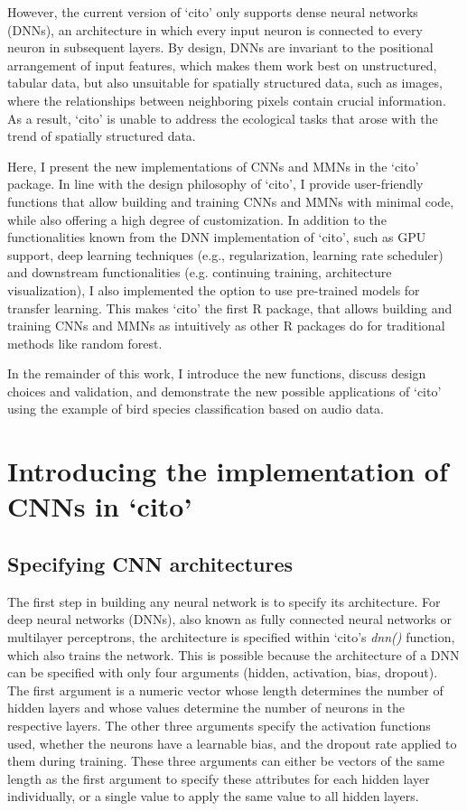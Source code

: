 \documentclass[12pt,twoside]{scrreport}
\newcommand{\pkg}[1]{`#1'}
\newcommand{\fn}[2][]{\textit{#2(}#1\textit{)}}
\begin{document}
However, the current version of \pkg{cito} only supports dense neural networks (DNNs), an architecture in which every input neuron is connected to every neuron in subsequent layers. By design, DNNs are invariant to the positional arrangement of input features, which makes them work best on unstructured, tabular data, but also unsuitable for spatially structured data, such as images, where the relationships between neighboring pixels contain crucial information. As a result, \pkg{cito} is unable to address the ecological tasks that arose with the trend of spatially structured data.

Here, I present the new implementations of CNNs and MMNs in the \pkg{cito} package. In line with the design philosophy of \pkg{cito}, I provide user-friendly functions that allow building and training CNNs and MMNs with minimal code, while also offering a high degree of customization. In addition to the functionalities known from the DNN implementation of \pkg{cito}, such as GPU support, deep learning techniques (e.g., regularization, learning rate scheduler) and downstream functionalities (e.g. continuing training, architecture visualization), I also implemented the option to use pre-trained models for transfer learning. This makes \pkg{cito} the first R package, that allows building and training CNNs and MMNs as intuitively as other R packages do for traditional methods like random forest.

In the remainder of this work, I introduce the new functions, discuss design choices and validation, and demonstrate the new possible applications of \pkg{cito} using the example of bird species classification based on audio data.

\chapter*{Introducing the implementation of CNNs in \pkg{cito}}
\addcontentsline{toc}{chapter}{Introducing the implementation of CNNs in \pkg{cito}}

\section*{Specifying CNN architectures}
The first step in building any neural network is to specify its architecture. For deep neural networks (DNNs), also known as fully connected neural networks or multilayer perceptrons, the architecture is specified within \pkg{cito}s \fn{dnn} function, which also trains the network. This is possible because the architecture of a DNN can be specified with only four arguments (hidden, activation, bias, dropout). The first argument is a numeric vector whose length determines the number of hidden layers and whose values determine the number of neurons in the respective layers. The other three arguments specify the activation functions used, whether the neurons have a learnable bias, and the dropout rate applied to them during training. These three arguments can either be vectors of the same length as the first argument to specify these attributes for each hidden layer individually, or a single value to apply the same value to all hidden layers.
\end{document}
